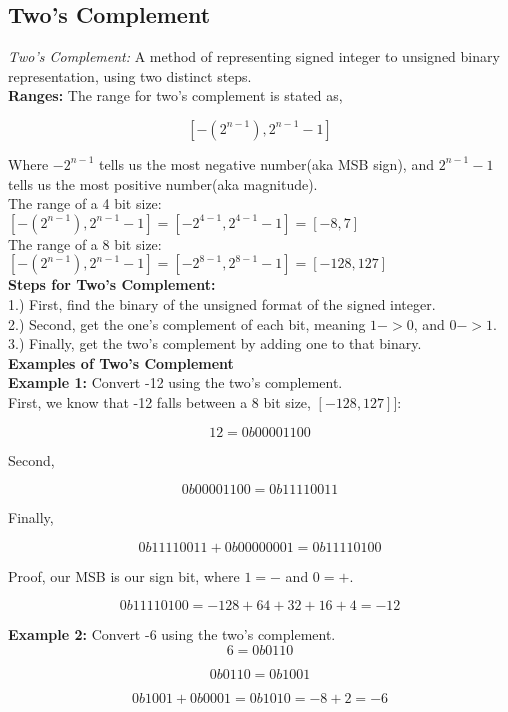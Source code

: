 \documentclass{article}
\begin{document}
\subsection*{Two's Complement} 
\textit{Two's Complement:} A method of representing signed integer to unsigned binary representation, using two
distinct steps. \\

\noindent \textbf{Ranges:} The range for two's complement is stated as,

\[
[-(2^{n-1}), 2^{n-1} - 1]
\]

\noindent Where $-2^{n-1}$ tells us the most negative number(aka MSB sign), and $2^{n-1} - 1$ tells us the most
positive number(aka magnitude). \\

\noindent The range of a 4 bit size: $[-(2^{n-1}), 2^{n-1} - 1] = [-2^{4-1}, 2^{4-1} - 1] = [-8, 7]$ \\

\noindent The range of a 8 bit size: $[-(2^{n-1}), 2^{n-1} - 1] = [-2^{8-1}, 2^{8-1} - 1] = [-128, 127]$ \\

\noindent \textbf{Steps for Two's Complement:} \\

1.) First, find the binary of the unsigned format of the signed integer. \\

2.) Second, get the one's complement of each bit, meaning $1 -> 0$, and $0 -> 1$. \\

3.) Finally, get the two's complement by adding one to that binary. \\

\noindent \textbf{Examples of Two's Complement} \\

\noindent \textbf{Example 1:} Convert -12 using the two's complement. \\

First, we know that -12 falls between a 8 bit size, $[-128, 127]]$:

\[
12 = 0b0000 1100
\] 

Second,

\[
0b0000 1100 = 0b1111 0011
\]

Finally,

\[
0b1111 0011 + 0b0000 0001 = 0b1111 0100
\]

Proof, our MSB is our sign bit, where $1 = -$ and $0 = +$.

\[
0b1111 0100 = -128 + 64 + 32 + 16 + 4 = -12
\]

\noindent \textbf{Example 2:} Convert -6 using the two's complement. \\

\[
6 = 0b0110
\]

\[
0b0110 = 0b1001
\]

\[
0b1001 + 0b0001 = 0b1010 = -8 + 2 = -6
\]



 
\end{document}
